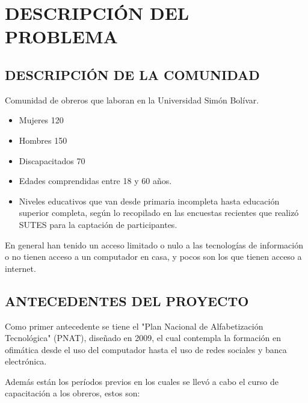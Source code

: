 	\chapter{DESCRIPCIÓN DEL PROBLEMA}
    
		\section{DESCRIPCIÓN DE LA COMUNIDAD}
			Comunidad de obreros que laboran en la Universidad Simón Bolívar. \cite{Web}
            \begin{itemize}
                \item Mujeres 120
                \item Hombres 150
                \item Discapacitados 70
                \item Edades comprendidas entre 18 y 60 años. 
                \item Niveles educativos que van desde primaria incompleta hasta educación superior completa, según lo recopilado en las encuestas recientes que realizó SUTES para la captación de participantes.
            \end{itemize}
            
            En general han tenido un acceso limitado o nulo a las tecnologías de información o no tienen acceso a un computador en casa, y pocos son los que tienen acceso a internet.
            
		\section{ANTECEDENTES DEL PROYECTO}
            Como primer antecedente se tiene el "Plan Nacional de Alfabetización Tecnológica" (PNAT), diseñado en 2009, el cual contempla la formación en ofimática desde el  uso del computador hasta el uso de redes sociales y banca electrónica.
            
            Además están los períodos previos en los cuales se llevó a cabo el curso de capacitación a los obreros, estos son:
            
